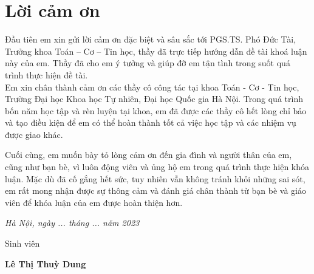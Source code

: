 \chapter*{Lời cảm ơn}

\fontsize{14}{16}\selectfont
\begin{center}
\end{center}
\hspace*{1.5cm}Đầu tiên em xin gửi lời cảm ơn đặc biệt và sâu sắc tới PGS.TS. Phó Đức Tài, Trưởng
khoa Toán – Cơ – Tin học, thầy đã trực tiếp hướng dẫn đề tài khoá luận này của em.
Thầy đã cho em ý tưởng và giúp đỡ em tận tình trong suốt quá trình thực hiện đề tài. \\
\hspace*{1.5cm} Em xin chân thành cảm ơn các thầy cô công tác tại khoa Toán - Cơ - Tin học,
Trường Đại học Khoa học Tự nhiên, Đại học Quốc gia Hà Nội. Trong quá trình bốn
năm học tập và rèn luyện tại khoa, em đã được các thầy cô hết lòng chỉ bảo và tạo
điều kiện để em có thể hoàn thành tốt cả việc học tập và các nhiệm vụ được giao
khác.

Cuối cùng, em muốn bày tỏ lòng cảm ơn đến gia đình và người thân của em, cũng như 
bạn bè, vì luôn động viên và ủng hộ em trong quá trình thực hiện khóa luận. 
Mặc dù đã cố gắng hết sức, tuy nhiên vẫn không tránh khỏi những sai sót, em rất mong 
nhận được sự thông cảm và đánh giá chân thành từ bạn bè và giáo viên để khóa luận của 
em được hoàn thiện hơn.
\begin{flushright}
{\it Hà Nội, ngày ... tháng ... năm 2023}

Sinh viên\hskip 2cm\quad

\vskip 1cm
{\bf Lê Thị Thuỳ Dung} \hskip 1cm \quad\ 
 \end{flushright}



